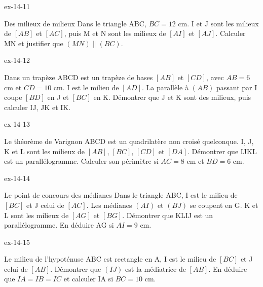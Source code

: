 \begin{blocLivre}{ex-14-11}\begin{exercice}[3]{Des milieux de milieux}
Dans le triangle ABC, $BC=12$ cm. I et J sont les milieux de $[AB]$ et $[AC]$, puis M et N sont les milieux de $[AI]$ et $[AJ]$. Calculer MN et justifier que $(MN)\parallel(BC)$.
\label{fig-ex-14-11}
\end{exercice}\end{blocLivre}
\begin{blocLivre}{ex-14-12}\begin{exercice}[3]{Dans un trapèze}
ABCD est un trapèze de bases $[AB]$ et $[CD]$, avec $AB=6$ cm et $CD=10$ cm. I est le milieu de $[AD]$. La parallèle à $(AB)$ passant par I coupe $[BD]$ en J et $[BC]$ en K. Démontrer que J et K sont des milieux, puis calculer IJ, JK et IK.
\label{fig-ex-14-12}
\end{exercice}\end{blocLivre}
\begin{blocLivre}{ex-14-13}\begin{exercice}[3]{Le théorème de Varignon}
ABCD est un quadrilatère non croisé quelconque. I, J, K et L sont les milieux de $[AB]$, $[BC]$, $[CD]$ et $[DA]$. Démontrer que IJKL est un parallélogramme. Calculer son périmètre si $AC=8$ cm et $BD=6$ cm.
\label{fig-ex-14-13}
\end{exercice}\end{blocLivre}
\begin{blocLivre}{ex-14-14}\begin{exercice}[3]{Le point de concours des médianes}
Dans le triangle ABC, I est le milieu de $[BC]$ et J celui de $[AC]$. Les médianes $(AI)$ et $(BJ)$ se coupent en G. K et L sont les milieux de $[AG]$ et $[BG]$. Démontrer que KLIJ est un parallélogramme. En déduire AG si $AI=9$ cm.
\label{fig-ex-14-14}
\end{exercice}\end{blocLivre}
\begin{blocLivre}{ex-14-15}\begin{exercice}[3]{Le milieu de l’hypoténuse}
ABC est rectangle en A, I est le milieu de $[BC]$ et J celui de $[AB]$. Démontrer que $(IJ)$ est la médiatrice de $[AB]$. En déduire que $IA=IB=IC$ et calculer IA si $BC=10$ cm.
\label{fig-ex-14-15}
\end{exercice}\end{blocLivre}

\clearpage
